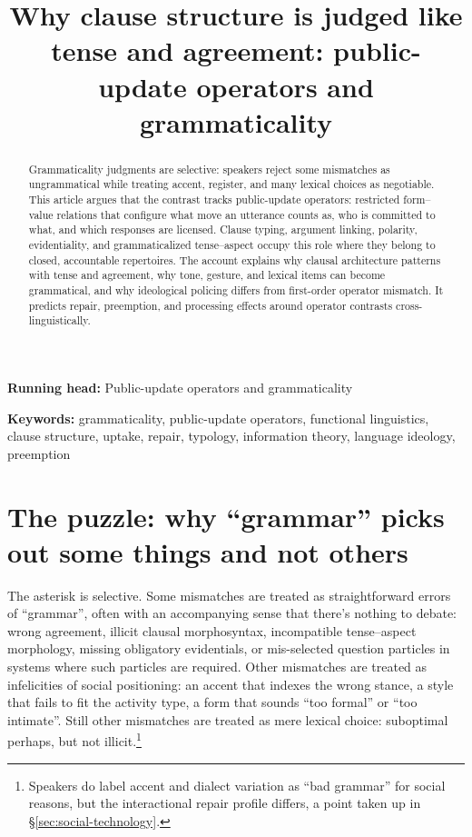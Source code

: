 \documentclass[12pt,letterpaper]{article}
\title{Why clause structure is judged like tense and agreement: public-update operators and grammaticality}
\author{}
\date{}
\begin{document}
\maketitle

\begin{abstract}
Grammaticality judgments are selective: speakers reject some mismatches as ungrammatical while treating accent, register, and many lexical choices as negotiable. This article argues that the contrast tracks public-update operators: restricted form--value relations that configure what move an utterance counts as, who is committed to what, and which responses are licensed. Clause typing, argument linking, polarity, evidentiality, and grammaticalized tense--aspect occupy this role where they belong to closed, accountable repertoires. The account explains why clausal architecture patterns with tense and agreement, why tone, gesture, and lexical items can become grammatical, and why ideological policing differs from first-order operator mismatch. It predicts repair, preemption, and processing effects around operator contrasts cross-linguistically.
\end{abstract}

\smallskip
\noindent \textbf{Running head:} Public-update operators and grammaticality

\smallskip
\noindent \textbf{Keywords:} grammaticality, public-update operators, functional linguistics, clause structure, uptake, repair, typology, information theory, language ideology, preemption


\section{The puzzle: why \enquote{grammar} picks out some things and not others}

The asterisk is selective. Some mismatches are treated as straightforward errors of \enquote{grammar}, often with an accompanying sense that there's nothing to debate: wrong agreement, illicit clausal morphosyntax, incompatible tense--aspect morphology, missing obligatory evidentials, or mis-selected question particles in systems where such particles are required. Other mismatches are treated as infelicities of social positioning: an accent that indexes the wrong stance, a style that fails to fit the activity type, a form that sounds \enquote{too formal} or \enquote{too intimate}. Still other mismatches are treated as mere lexical choice: suboptimal perhaps, but not illicit.\footnote{Speakers do label accent and dialect variation as \enquote{bad grammar} for social reasons, but the interactional repair profile differs, a point taken up in \S\ref{sec:social-technology}.}
\end{document}
